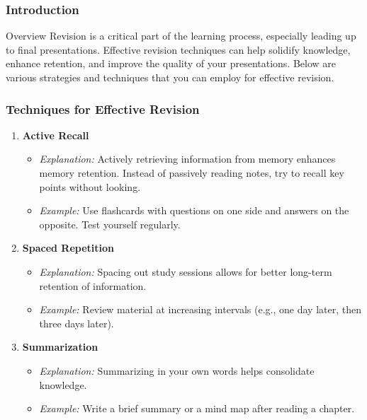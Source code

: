 \documentclass[aspectratio=169]{beamer}
\begin{document}
\begin{frame}[fragile]
    \frametitle{Introduction}
    \begin{block}{Overview}
        Revision is a critical part of the learning process, especially leading up to final presentations. Effective revision techniques can help solidify knowledge, enhance retention, and improve the quality of your presentations. Below are various strategies and techniques that you can employ for effective revision.
    \end{block}
\end{frame}

\begin{frame}[fragile]
    \frametitle{Techniques for Effective Revision}
    \begin{enumerate}
        \item \textbf{Active Recall}
        \begin{itemize}
            \item \textit{Explanation:} Actively retrieving information from memory enhances memory retention. Instead of passively reading notes, try to recall key points without looking.
            \item \textit{Example:} Use flashcards with questions on one side and answers on the opposite. Test yourself regularly.
        \end{itemize}
        
        \item \textbf{Spaced Repetition}
        \begin{itemize}
            \item \textit{Explanation:} Spacing out study sessions allows for better long-term retention of information.
            \item \textit{Example:} Review material at increasing intervals (e.g., one day later, then three days later).
        \end{itemize}
        
        \item \textbf{Summarization}
        \begin{itemize}
            \item \textit{Explanation:} Summarizing in your own words helps consolidate knowledge.
            \item \textit{Example:} Write a brief summary or a mind map after reading a chapter.
        \end{itemize}
    \end{enumerate}
\end{frame}
\end{document}
